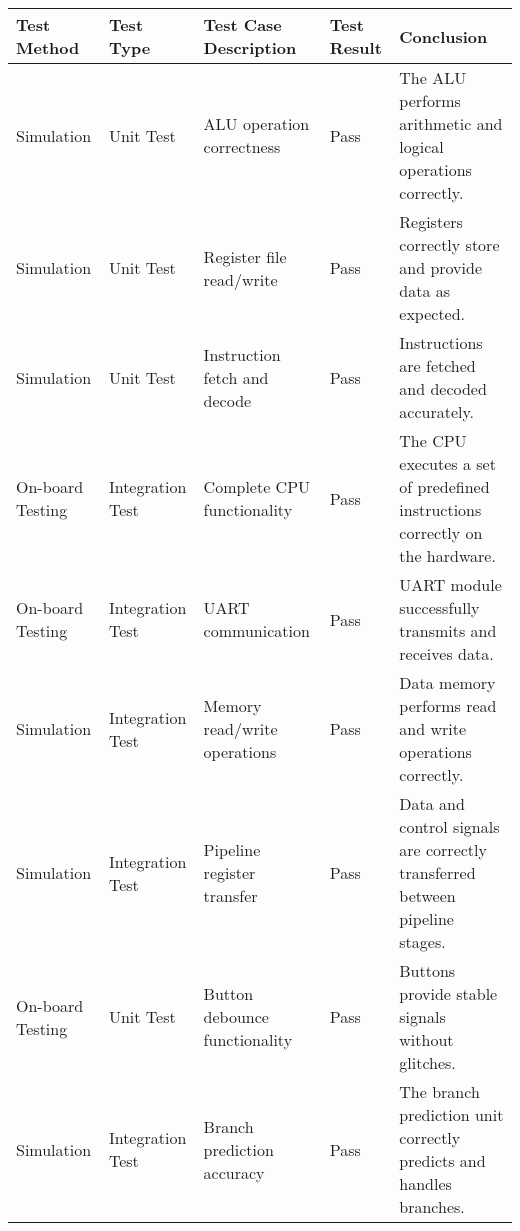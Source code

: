 \documentclass[a4paper,12pt]{article}
\begin{document}
\begin{center}
    \begin{tabular}{|p{2.5cm}|p{2.5cm}|p{3cm}|p{1.5cm}|p{3.5cm}|}
        \hline
        \textbf{Test Method} & \textbf{Test Type} & \textbf{Test Case Description} & \textbf{Test Result} & \textbf{Conclusion} \\
        \hline
        Simulation & Unit Test & ALU operation \newline correctness & Pass & The ALU performs arithmetic \newline and logical operations correctly. \\
        \hline
        Simulation & Unit Test & Register file \newline read/write & Pass & Registers correctly store \newline and provide data as expected. \\
        \hline
        Simulation & Unit Test & Instruction fetch \newline and decode & Pass & Instructions are fetched \newline and decoded accurately. \\
        \hline
        On-board Testing & Integration Test & Complete CPU \newline functionality & Pass & The CPU executes a set \newline of predefined instructions \newline correctly on the hardware. \\
        \hline
        On-board Testing & Integration Test & UART communication & Pass & UART module successfully \newline transmits and receives data. \\
        \hline
        Simulation & Integration Test & Memory read/write \newline operations & Pass & Data memory performs \newline read and write operations \newline correctly. \\
        \hline
        Simulation & Integration Test & Pipeline register \newline transfer & Pass & Data and control signals \newline are correctly transferred \newline between pipeline stages. \\
        \hline
        On-board Testing & Unit Test & Button debounce \newline functionality & Pass & Buttons provide stable \newline signals without glitches. \\
        \hline
        Simulation & Integration Test & Branch prediction \newline accuracy & Pass & The branch prediction unit \newline correctly predicts and handles \newline branches. \\
        \hline
    \end{tabular}
\end{center}
\end{document}
